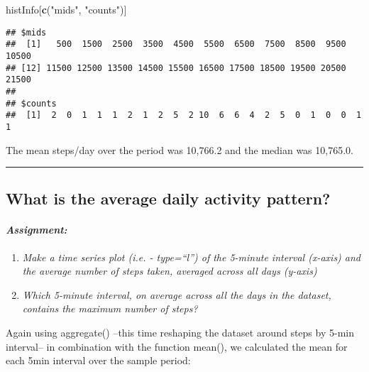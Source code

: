 \documentclass[]{article}
\newenvironment{Shaded}{\begin{snugshade}}{\end{snugshade}}
\newcommand{\KeywordTok}[1]{\textcolor[rgb]{0.13,0.29,0.53}{\textbf{#1}}}
\newcommand{\NormalTok}[1]{#1}
\newcommand{\StringTok}[1]{\textcolor[rgb]{0.31,0.60,0.02}{#1}}
\providecommand{\tightlist}{%
  \setlength{\itemsep}{0pt}\setlength{\parskip}{0pt}}
\let\oldparagraph\paragraph
\renewcommand{\paragraph}[1]{\oldparagraph{#1}\mbox{}}
\begin{document}
\begin{Shaded}
\begin{Highlighting}[]
\NormalTok{histInfo[}\KeywordTok{c}\NormalTok{(}\StringTok{"mids"}\NormalTok{, }\StringTok{"counts"}\NormalTok{)]}
\end{Highlighting}
\end{Shaded}

\begin{verbatim}
## $mids
##  [1]   500  1500  2500  3500  4500  5500  6500  7500  8500  9500 10500
## [12] 11500 12500 13500 14500 15500 16500 17500 18500 19500 20500 21500
## 
## $counts
##  [1]  2  0  1  1  1  2  1  2  5  2 10  6  6  4  2  5  0  1  0  0  1  1
\end{verbatim}

The mean steps/day over the period was 10,766.2 and the median was
10,765.0.

\begin{center}\rule{0.5\linewidth}{\linethickness}\end{center}

\hypertarget{what-is-the-average-daily-activity-pattern}{%
\subsection{What is the average daily activity
pattern?}\label{what-is-the-average-daily-activity-pattern}}

\hypertarget{assignment-3}{%
\paragraph{\texorpdfstring{\emph{Assignment:}}{Assignment:}}\label{assignment-3}}

\begin{enumerate}
\def\labelenumi{\arabic{enumi}.}
\tightlist
\item
  \emph{Make a time series plot (i.e. - type=``l'') of the 5-minute
  interval (x-axis) and the average number of steps taken, averaged
  across all days (y-axis)}\\
\item
  \emph{Which 5-minute interval, on average across all the days in the
  dataset, contains the maximum number of steps?}
\end{enumerate}

Again using aggregate() --this time reshaping the dataset around steps
by 5-min interval-- in combination with the function mean(), we
calculated the mean for each 5min interval over the sample period:
\end{document}
